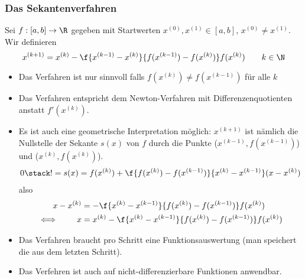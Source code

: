\documentclass[11pt]{scrartcl}
\begin{document}
\subsubsection{Das Sekantenverfahren}

\begin{df}[Sekantenverfahren] \label{3.5}
	Sei $f:[a,b] \to \R$ gegeben mit Startwerten $x^{(0)}, x^{(1)} \in [a,b]$, $x^{(0)} \neq x^{(1)}$.
	Wir definieren
	\[
		x^{(k+1)} = x^{(k)} - \f {x^{(k-1)} - x^{(k)}}{f(x^{(k-1)}) - f(x^{(k)})} f(x^{(k)})
		\qquad k\in \N
	\]
	\begin{note}
		\begin{itemize}
			\item
				Das Verfahren ist nur sinnvoll falls $f(x^{(k)}) \neq f(x^{(k-1)})$ für alle $k$
			\item
				Das Verfahren entspricht dem Newton-Verfahren mit Differenzenquotienten anstatt $f'(x^{(k)})$.
			\item
				Es ist auch eine geometrische Interpretation möglich:
				$x^{(k+1)}$ ist nämlich die Nullstelle der Sekante $s(x)$ von $f$ durch die Punkte ($x^{(k-1)}, f(x^{(k-1)})$) und ($x^{(k)},f(x^{(k)})$).
				\begin{align*}
					0 \stack != s(x) = f(x^{(k)}) + \f {f(x^{(k)})-f(x^{(k-1)})}{x^{(k)}-x^{(k-1)}} (x-x^{(k)})
				\end{align*}
				also
				\begin{align*}
					x-x^{(k)} &= - \f {x^{(k)}-x^{(k-1)}}{f(x^{(k)}) - f(x^{(k-1)})} f(x^{(k)}) \\
					\iff \qquad
					x &= x^{(k)} - \f {x^{(k)}-x^{(k-1)}}{f(x^{(k)}) - f(x^{(k-1)})} f(x^{(k)})
				\end{align*}
			\item
				Das Verfahren braucht pro Schritt eine Funktionsauswertung (man speichert die aus dem letzten Schritt).
			\item
				Das Verfehren ist auch auf nicht-differenzierbare Funktionen anwendbar.
		\end{itemize}
	\end{note}
\end{df}
\end{document}
